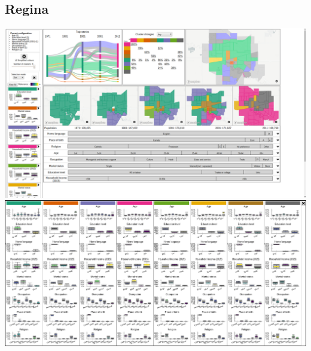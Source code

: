 \documentclass[a4paper]{article}
\begin{document}
\subsection{Regina}
\begin{center}
	\includegraphics[width=\linewidth]{6a.png}
	\includegraphics[width=\linewidth]{6b.png}
\end{center}
\end{document}
